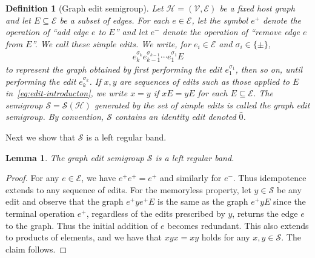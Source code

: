 \documentclass[11pt,a4paper]{article}
\newtheorem{definition}[theorem]{Definition}
\newtheorem{lemma}[theorem]{Lemma}
\begin{document}
\begin{definition}[Graph edit semigroup]\label{def:graph-edit-semigroup}
    Let $\mathcal{H}=(\mathcal{V},\mathcal{E})$ be a fixed host graph and let $E\subseteq\mathcal{E}$ be a subset of edges. For each $e\in \mathcal{E}$, let the symbol ${e^+}$ denote the operation of ``add edge $e$ to $E$'' and let ${e^-}$ denote the operation of ``remove edge $e$ from $E$''. We call these {\normalfont simple edits}. We write, for $e_i\in {\mathcal{E}}$ and $\sigma_i\in\{\pm\}$,
        \begin{align}\label{eq:edit-introducton}
            e_k^{\sigma_k} e_{k-1}^{\sigma_{k-1}} \cdots e_{1}^{\sigma_1} E
        \end{align}
    to represent the graph obtained by {\normalfont first} performing the edit $e_{1}^{\sigma_1}$, then so on, until performing the edit $e_k^{\sigma_k}$. If $x, y$ are sequences of edits such as those applied to $E$ in~\cref{eq:edit-introducton}, we write $x = y$ if $xE = yE$ for each $E\subseteq\mathcal{E}$. The semigroup $\mathcal{S} = \mathcal{S}(\mathcal{H})$ generated by the set of simple edits is called the {\normalfont graph edit semigroup}. By convention, $\mathcal{S}$ contains an identity edit denoted $\widehat{0}$.
\end{definition}

Next we show that $\mathcal{S}$ is a left regular band.

\begin{lemma}\label{lem:lrb-graph-edits}
    The graph edit semigroup $\mathcal{S}$ is a left regular band.
\end{lemma}

\begin{proof}
    For any $e\in\mathcal{E}$, we have ${e^+}{e^+} = e^+$ and similarly for $e^-$. Thus idempotence extends to any sequence of edits. For the memoryless property, let $y\in \mathcal{S}$ be any edit and observe that the graph ${e^+}y{e^+}E$ is the same as the graph ${e^+} y E$ since the terminal operation ${e^+}$, regardless of the edits prescribed by $y$, returns the edge $e$ to the graph. Thus the initial addition of $e$ becomes redundant. This also extends to products of elements, and we have that $xyx = xy$ holds for any $x, y\in \mathcal{S}$. The claim follows.
\end{proof}
\end{document}
